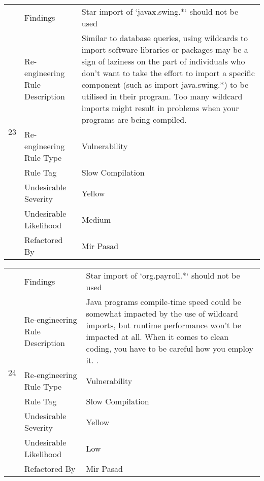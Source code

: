 \documentclass[12pt,english]{article}
\begin{document}
\begin{table}[!ht]
    \begin{tabularx}{\textwidth}{|c|l|X|}
    \hline
        \multirow{7}{*}{23} & Findings & Star import of ‘javax.swing.*‘ should not be used \\ \cline{2-3}
        & Re-engineering Rule Description & Similar to database queries, using wildcards to import software libraries or packages may be a sign of laziness on the part of individuals who don't want to take the effort to import a specific component (such as import java.swing.*) to be utilised in their program.  Too many wildcard imports might result in problems when your programs are being compiled.
 \\ \cline{2-3}
        & Re-engineering Rule Type & Vulnerability \\ \cline{2-3}
        & Rule Tag & Slow Compilation \\ \cline{2-3}
        & Undesirable Severity & Yellow \\ \cline{2-3}
        & Undesirable Likelihood & Medium \\ \cline{2-3}
        & Refactored By & Mir Pasad \\ \hline
    \end{tabularx}
\end{table}

\begin{table}[!ht]
    \begin{tabularx}{\textwidth}{|c|l|X|}
    \hline
        \multirow{7}{*}{24} & Findings & Star import of ‘org.payroll.*‘ should not be used \\ \cline{2-3}
        & Re-engineering Rule Description & Java programs compile-time speed could be somewhat impacted by the use of wildcard imports, but runtime performance won't be impacted at all. When it comes to clean coding, you have to be careful how you employ it.
. \\ \cline{2-3}
        & Re-engineering Rule Type & Vulnerability \\ \cline{2-3}
        & Rule Tag & Slow Compilation  \\ \cline{2-3}
        & Undesirable Severity & Yellow \\ \cline{2-3}
        & Undesirable Likelihood & Low \\ \cline{2-3}
        & Refactored By & Mir Pasad \\ \hline
    \end{tabularx}
\end{table}
\end{document}
